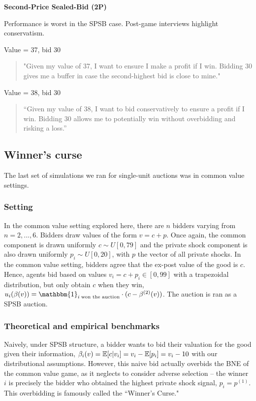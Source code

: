 \documentclass{article} %
\begin{document}
\textbf{Second-Price Sealed-Bid (2P)}

Performance is worst in the SPSB case. 
Post-game interviews highlight conservatism.

Value = 37, bid 30
\begin{quote}
    "Given my value of 37, I want to ensure I make a profit if I win. Bidding 30 gives me a buffer in case the second-highest bid is close to mine."
\end{quote}

Value = 38, bid 30
\begin{quote}
    “Given my value of 38, I want to bid conservatively to ensure a profit if I win. Bidding 30 allows me to potentially win without overbidding and risking a loss.”
\end{quote}







\subsection{Winner's curse}\label{session:winner}
The last set of simulations we ran for single-unit auctions was in common value settings. 

\subsubsection{Setting}
In the common value setting explored here, there are $n$ bidders varying from $n = 2, ..., 6$. 
Bidders draw values of the form $v = c + p$. Once again, the common component is drawn uniformly $c \sim U[0, 79]$ and the private shock component is also drawn uniformly $p_i \sim U[0, 20]$, with $p$ the vector of all private shocks. 
In the common value setting, bidders agree that the ex-post value of the good is $c$. 
Hence, agents bid based on values $v_i = c + p_i \in [0, 99]$ with a trapezoidal distribution, but only obtain $c$ when they win, $u_i(\beta(v)) = \mathbbm{1}_{i \; \text{won the auction}} \cdot (c - \beta^{(2)}(v))$. 
The auction is ran as a SPSB auction. 

\subsubsection{Theoretical and empirical benchmarks}
Naively, under SPSB structure, a bidder wants to bid their valuation for the good given their information, $\beta_i(v) = \mathbb{E}[c | v_i] = v_i - \mathbb{E}[p_i] = v_i - 10$ with our distributional assumptions. 
However, this naive bid actually overbids the BNE of the common value game, as it neglects to consider adverse selection -- the winner $i$ is precisely the bidder who obtained the highest private shock signal, $p_i = p^(1)$. 
This overbidding is famously called the ``Winner's Curse." 
\end{document}
